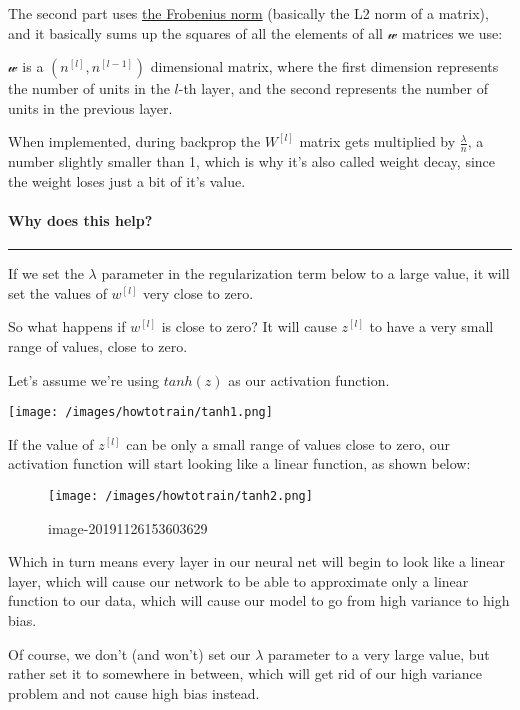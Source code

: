 \documentclass[
]{article}
\begin{document}
The second part uses
\href{http://mathworld.wolfram.com/FrobeniusNorm.html}{the Frobenius
norm} (basically the L2 norm of a matrix), and it basically sums up the
squares of all the elements of all \(\mathcal{w}\) matrices we use:

\(\mathcal{w}\) is a \((n^{[l]}, n^{[l-1]})\) dimensional matrix, where
the first dimension represents the number of units in the \(l\)-th
layer, and the second represents the number of units in the previous
layer.

When implemented, during backprop the \(W^{[l]}\) matrix gets multiplied
by \(\frac{\lambda}{n}\), a number slightly smaller than 1, which is why
it's also called weight decay, since the weight loses just a bit of it's
value.

\hypertarget{header-n97}{%
\paragraph{\texorpdfstring{\textbf{Why does this
help?}}{Why does this help?}}\label{header-n97}}

\begin{center}\rule{0.5\linewidth}{0.5pt}\end{center}

If we set the \(\lambda\) parameter in the regularization term below to
a large value, it will set the values of \(w^{[l]}\) very close to zero.

So what happens if \(w^{[l]}\) is close to zero? It will cause
\(z^{[l]}\) to have a very small range of values, close to zero.

Let's assume we're using \(tanh(z)\) as our activation function.

\texttt{[image: /images/howtotrain/tanh1.png]}

If the value of \(z^{[l]}\) can be only a small range of values close to
zero, our activation function will start looking like a linear function,
as shown below:

\begin{figure}
\centering
\texttt{[image: /images/howtotrain/tanh2.png]}
\caption{image-20191126153603629}
\end{figure}

Which in turn means every layer in our neural net will begin to look
like a linear layer, which will cause our network to be able to
approximate only a linear function to our data, which will cause our
model to go from high variance to high bias.

Of course, we don't (and won't) set our \(\lambda\) parameter to a very
large value, but rather set it to somewhere in between, which will get
rid of our high variance problem and not cause high bias instead.
\end{document}
